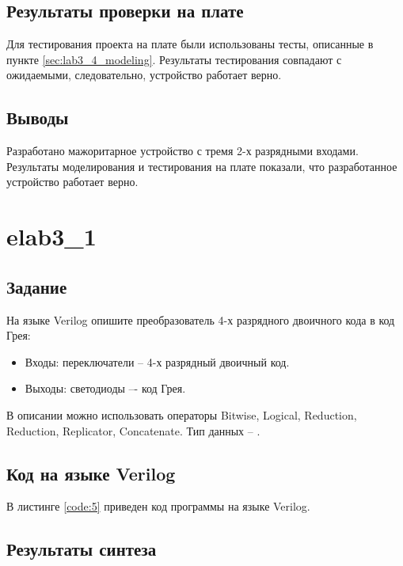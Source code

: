 \subsection{Результаты проверки на плате}

Для тестирования проекта на плате были использованы тесты, описанные в пункте \ref{sec:lab3_4_modeling}. Результаты тестирования совпадают с ожидаемыми, следовательно, устройство работает верно.

\subsection{Выводы}

Разработано мажоритарное устройство с тремя 2-х разрядными входами. Результаты моделирования и тестирования на плате показали, что разработанное устройство работает верно.

\section{elab3\_1}

\subsection{Задание}

На языке Verilog опишите преобразователь 4-х разрядного двоичного кода в код Грея:
\begin{itemize}
	\item Входы: переключатели  -- 4-х разрядный двоичный код.
	\item Выходы: светодиоды  –- код Грея.
\end{itemize}

В описании можно использовать операторы Bitwise, Logical, Reduction, Reduction, Replicator, Concatenate. Тип данных -- .

\subsection{Код на языке Verilog}

В листинге \ref{code:5} приведен код программы на языке Verilog.

%

\subsection{Результаты синтеза}

